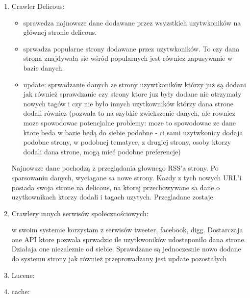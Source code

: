 \begin{enumerate}
\item Crawler Delicous:

\begin{itemize}
\item sprawedza najnowsze dane dodawane przez wsyzstkich uzytwkoników na głównej stronie delicous.
\item sprwadza popularne strony dodawane przez uzytwkoników. To czy dana strona znajdywała sie wśród popularnych jest równiez zapusywanie w bazie danych.
\item update: sprwadzanie danych ze strony uzywtkoników którzy już są dodani jak również sprawdzanie czy strony ktore juz były dodane nie otrzymały nowych tagów i czy nie było innych uzytkowników którzy dana strone dodali równiez (pozwala to na szybkie zwiekszenie danych, ale rowniez moze spowodowac potencjalne problemy: moze to spowodowac ze dane ktore beda w bazie bedą do siebie podobne - ci sami uzytwkonicy dodaja podobne strony, w podobnej tematyce, z drugiej strony,  osoby ktorzy dodali dana strone, mogą mieć podobne preferencje)
\end{itemize}

Najnowsze dane pochodzą z przeglądania głownego RSS’a strony. Po sparsowaniu danych, wyciagane sa nowe strony. Kazdy z tych nowych URL’i posiada swoja strone na delicous, na ktorej przechowywane sa dane o uzytkownikach ktorzy dodali i tagach uzytych. Przegladane zostaje



\item Crawlery innych serwisów społecznościowych:

w swoim systemie korzystam z serwisów tweeter, facebook, digg. Dostarczaja one API ktore pozwala sprwadzic ile uzytkwoników udosteponiło dana strone. Działaja one niezaleznie od siebie. Sprawdzane są jednoczesnie nowo dodane do systemu strony jak również przeprowadzany jest update pozostałych

\item Lucene:




\item cache:


\end{enumerate}
